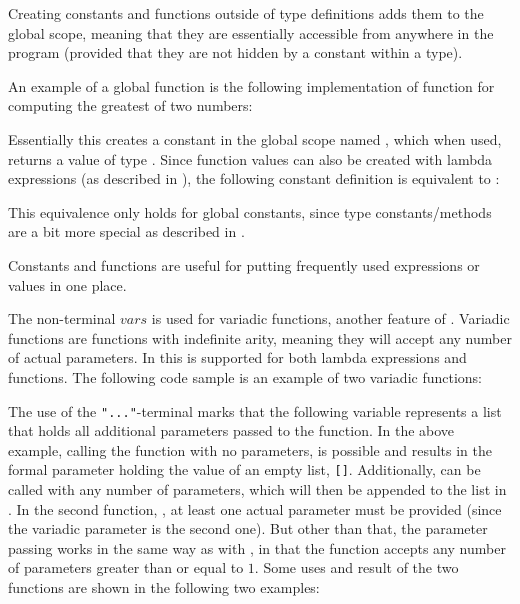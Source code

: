 Creating constants and functions outside of type definitions adds them to the
global scope, meaning that they are essentially accessible from anywhere in the
program (provided that they are not hidden by a constant within a type).

An example of a global function is the following implementation of function for
computing the greatest of two numbers:


Essentially this creates a constant in the global scope named ,
which when used, returns a value of type . Since function values
can also be created with lambda expressions (as described in
), the following constant definition is equivalent
to :


This equivalence only holds for global constants, since type constants/methods
are a bit more special as described in .

Constants and functions are useful for putting frequently used expressions or
values in one place.

The non-terminal $vars$ is used for variadic functions, another feature of
\productname{}. Variadic functions are functions with indefinite arity, meaning
they will accept any number of actual parameters. In \productname{} this is
supported for both lambda expressions and functions. The following code sample
is an example of two variadic functions:


The use of the \texttt{"..."}-terminal marks that the following variable
represents a list that holds all additional parameters passed to the function.
In the above example, calling the function  with no parameters,
is possible and results in the formal parameter  holding the
value of an empty list, \texttt{[]}. Additionally,  can be called
with any number of parameters, which will then be appended to the list in
. In the second function, , at least one
actual parameter must be provided (since the variadic parameter is the second
one). But other than that, the parameter passing works in the same way as with
, in that the function accepts any number of parameters greater
than or equal to $1$. Some uses and result of the two functions are shown in the
following two examples:

